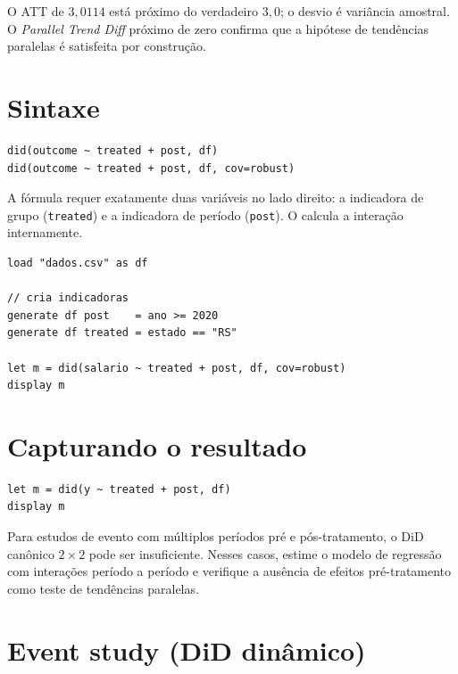 O ATT de $3{,}0114$ está próximo do verdadeiro $3{,}0$; o desvio é variância
amostral. O \emph{Parallel Trend Diff} próximo de zero confirma que a
hipótese de tendências paralelas é satisfeita por construção.

\section{Sintaxe}

\begin{lstlisting}
did(outcome ~ treated + post, df)
did(outcome ~ treated + post, df, cov=robust)
\end{lstlisting}

A fórmula requer exatamente duas variáveis no lado direito: a indicadora de
grupo (\lstinline{treated}) e a indicadora de período (\lstinline{post}).
O \hayashi{} calcula a interação internamente.

\begin{lstlisting}[caption={Fluxo típico de DiD}]
load "dados.csv" as df

// cria indicadoras
generate df post    = ano >= 2020
generate df treated = estado == "RS"

let m = did(salario ~ treated + post, df, cov=robust)
display m
\end{lstlisting}

\section{Capturando o resultado}

\begin{lstlisting}
let m = did(y ~ treated + post, df)
display m
\end{lstlisting}

\begin{nota}
  Para estudos de evento com múltiplos períodos pré e pós-tratamento,
  o DiD canônico $2\times 2$ pode ser insuficiente. Nesses casos,
  estime o modelo de regressão com interações período a período e
  verifique a ausência de efeitos pré-tratamento como teste de
  tendências paralelas.
\end{nota}

\section{Event study (DiD dinâmico)}


